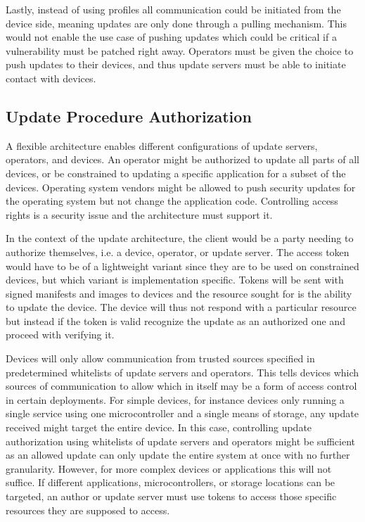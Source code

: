 \documentclass[0-thesis.tex]{subfiles}
\begin{document}
Lastly, instead of using profiles all communication could be initiated from the device
side, meaning updates are only done through a pulling mechanism. This would not enable the
use case of pushing updates which could be critical if a vulnerability must be patched
right away. Operators must be given the choice to push updates to their devices, and thus
update servers must be able to initiate contact with devices.

\subsection{Update Procedure Authorization}
\label{ssec:authorization}
A flexible architecture enables different configurations of update servers, operators, and
devices. An operator might be authorized to update all parts of all devices, or be
constrained to updating a specific application for a subset of the devices. Operating
system vendors might be allowed to push security updates for the operating system but not
change the application code. Controlling access rights is a security issue and the
architecture must support it.

In the context of the update architecture, the client would be a party needing to
authorize themselves, i.e. a device, operator, or update server. The access token would
have to be of a lightweight variant since they are to be used on constrained devices, but
which variant is implementation specific. Tokens will be sent with signed manifests and
images to devices and the resource sought for is the ability to update the device. The
device will thus not respond with a particular resource but instead if the token is valid
recognize the update as an authorized one and proceed with verifying it. 

Devices will only allow communication from trusted sources specified in predetermined
whitelists of update servers and operators. This tells devices which sources of
communication to allow which in itself may be a form of access control in certain
deployments. For simple devices, for instance devices only running a single service using
one microcontroller and a single means of storage, any update received might target the
entire device. In this case, controlling update authorization using whitelists of update
servers and operators might be sufficient as an allowed update can only update the entire
system at once with no further granularity. However, for more complex devices or
applications this will not suffice. If different applications, microcontrollers, or
storage locations can be targeted, an author or update server must use tokens to access
those specific resources they are supposed to access.
\end{document}
